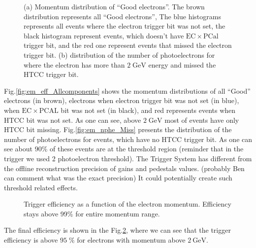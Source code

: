 \begin{figure}[!htb]
 \centering
 \caption{(a) Momentum distribution of ``Good electrons''. The brown distribution represents all ``Good electrons'', The blue histograms represents all events where the electron trigger bit was not set, the black histogram represent events, which doesn't have $\mathrm{EC}\times \mathrm{PCal}$ trigger bit, and the red one represent events that missed the electron trigger bit. (b) distribution of the number of photoelectrons for where the electron has more than $\mathrm{2\;GeV}$ energy and missed the HTCC trigger bit.}
 \label{fig:em_missed_events}
\end{figure}

Fig.\ref{fig:em_eff_Allcomponents} shows the momentum distributions of all ``Good'' electrons (in brown), electrons when electron trigger bit was not set  (in blue), when $\mathrm{EC}\times \mathrm{PCAL}$ bit was not set (in black), and red represents events when HTCC bit was not set. As one can see, above $\mathrm{2\; GeV}$ most of events have only HTCC bit missing.  Fig.\ref{fig:em_nphe_Miss} presents the distribution of the number of photoelectrons for events, which have no  HTCC trigger bit. As one can see about $\mathrm{90\%}$ of these events are    at the threshold region (reminder that in the trigger we used 2 photoelectron threshold).  The Trigger System has different from the offline reconstruction  precision of gains and pedestals values. ({\color{Red}probably Ben can comment what was the exact precision}) It could potentially create  such threshold related effects.

\begin{figure}[!htb]
 \centering
 \caption{Trigger efficiency as a function of the electron momentum. Efficiency stays above 99\% for entire momentum range.}
 \label{fig:em_eff}
\end{figure}

The final efficiency is shown in the Fig.\ref{fig:em_eff}, where we can see that  the trigger efficiency is above $\mathrm{95\; \%}$
for electrons with momentum above $\mathrm{2\ GeV}$.

